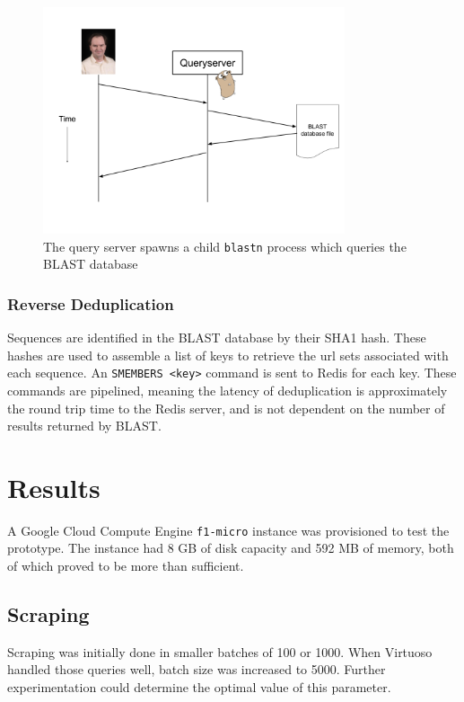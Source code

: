 \documentclass[journal,comsoc]{IEEEtran}
\begin{document}
\begin{figure}[!t]
\centering
\includegraphics[width=3.5in]{queryserver}
\caption{The query server spawns a child \texttt{blastn} process which queries 
the BLAST database}
\label{queryserver}
\end{figure}

\subsubsection{Reverse Deduplication}

Sequences are identified in the BLAST database by their SHA1 hash. These hashes
are used to assemble a list of keys to retrieve the url sets associated with each
sequence. An \texttt{SMEMBERS <key>} command is sent to Redis for each key. These
commands are pipelined, meaning the latency of deduplication is approximately the
round trip time to the Redis server, and is not dependent on the number of results
returned by BLAST.

\section{Results}

A Google Cloud Compute Engine \texttt{f1-micro} instance was provisioned to 
test the prototype. The instance had 8 GB of disk capacity and 592 MB of 
memory, both of which proved to be more than sufficient.

\subsection{Scraping}

Scraping was initially done in smaller batches of 100 or 1000. When Virtuoso 
handled those queries well, batch size was increased to 5000. Further experimentation
could determine the optimal value of this parameter. 
\end{document}
